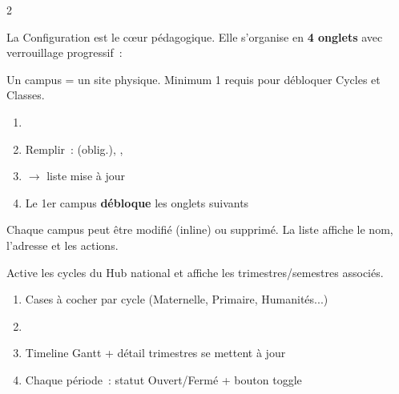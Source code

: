 \newpage

\begin{multicols}{2}

{\scriptsize La Configuration est le c\oe ur p\'edagogique. Elle s'organise en \textbf{4 onglets} avec verrouillage progressif~:}

\begin{center}
\end{center}


{\scriptsize Un campus = un site physique. Minimum 1 requis pour d\'ebloquer Cycles et Classes.}

\begin{stepbox}[title={\faPlus\ Cr\'eer un campus}]
\begin{enumerate}[label=\textcolor{indigo}{\scriptsize\textbf{\arabic*.}},font=\scriptsize,itemsep=0pt]
  \item {}
  \item Remplir~:  (oblig.), , 
  \item {} $\to$ liste mise \`a jour
  \item Le 1er campus \textbf{d\'ebloque} les onglets suivants
\end{enumerate}
\end{stepbox}

{\scriptsize Chaque campus peut \^etre modifi\'e (inline) ou supprim\'e. La liste affiche le nom, l'adresse et les actions.}


{\scriptsize Active les cycles du Hub national et affiche les trimestres/semestres associ\'es.}

\begin{stepbox}[title={\faCheck\ Activer des cycles}]
\begin{enumerate}[label=\textcolor{indigo}{\scriptsize\textbf{\arabic*.}},font=\scriptsize,itemsep=0pt]
  \item Cases \`a cocher par cycle (Maternelle, Primaire, Humanit\'es...)
  \item {}
  \item Timeline Gantt + d\'etail trimestres se mettent \`a jour
  \item Chaque p\'eriode~: statut Ouvert/Ferm\'e + bouton toggle
\end{enumerate}
\end{stepbox}


\end{multicols}
